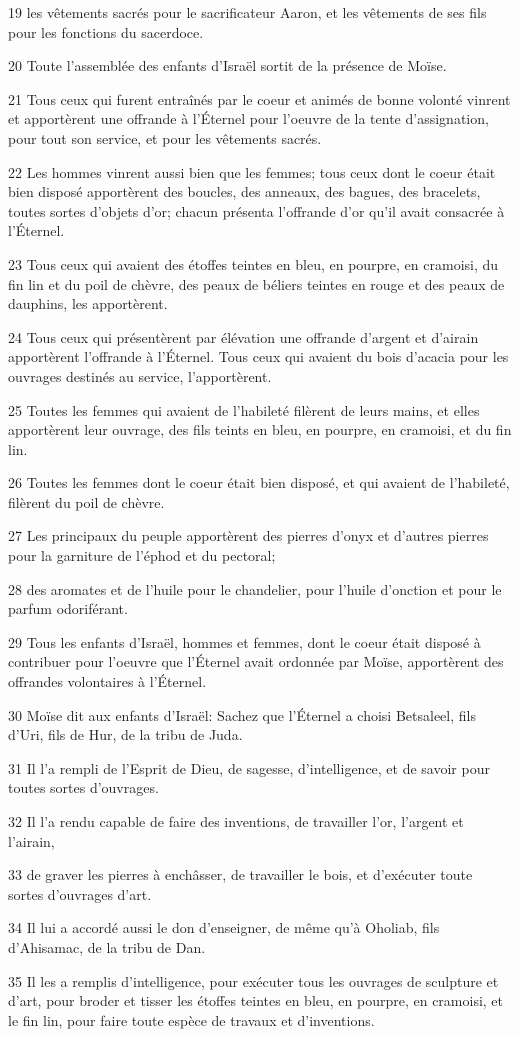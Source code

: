 \par 19 les vêtements sacrés pour le sacrificateur Aaron, et les vêtements de ses fils pour les fonctions du sacerdoce.
\par 20 Toute l'assemblée des enfants d'Israël sortit de la présence de Moïse.
\par 21 Tous ceux qui furent entraînés par le coeur et animés de bonne volonté vinrent et apportèrent une offrande à l'Éternel pour l'oeuvre de la tente d'assignation, pour tout son service, et pour les vêtements sacrés.
\par 22 Les hommes vinrent aussi bien que les femmes; tous ceux dont le coeur était bien disposé apportèrent des boucles, des anneaux, des bagues, des bracelets, toutes sortes d'objets d'or; chacun présenta l'offrande d'or qu'il avait consacrée à l'Éternel.
\par 23 Tous ceux qui avaient des étoffes teintes en bleu, en pourpre, en cramoisi, du fin lin et du poil de chèvre, des peaux de béliers teintes en rouge et des peaux de dauphins, les apportèrent.
\par 24 Tous ceux qui présentèrent par élévation une offrande d'argent et d'airain apportèrent l'offrande à l'Éternel. Tous ceux qui avaient du bois d'acacia pour les ouvrages destinés au service, l'apportèrent.
\par 25 Toutes les femmes qui avaient de l'habileté filèrent de leurs mains, et elles apportèrent leur ouvrage, des fils teints en bleu, en pourpre, en cramoisi, et du fin lin.
\par 26 Toutes les femmes dont le coeur était bien disposé, et qui avaient de l'habileté, filèrent du poil de chèvre.
\par 27 Les principaux du peuple apportèrent des pierres d'onyx et d'autres pierres pour la garniture de l'éphod et du pectoral;
\par 28 des aromates et de l'huile pour le chandelier, pour l'huile d'onction et pour le parfum odoriférant.
\par 29 Tous les enfants d'Israël, hommes et femmes, dont le coeur était disposé à contribuer pour l'oeuvre que l'Éternel avait ordonnée par Moïse, apportèrent des offrandes volontaires à l'Éternel.
\par 30 Moïse dit aux enfants d'Israël: Sachez que l'Éternel a choisi Betsaleel, fils d'Uri, fils de Hur, de la tribu de Juda.
\par 31 Il l'a rempli de l'Esprit de Dieu, de sagesse, d'intelligence, et de savoir pour toutes sortes d'ouvrages.
\par 32 Il l'a rendu capable de faire des inventions, de travailler l'or, l'argent et l'airain,
\par 33 de graver les pierres à enchâsser, de travailler le bois, et d'exécuter toute sortes d'ouvrages d'art.
\par 34 Il lui a accordé aussi le don d'enseigner, de même qu'à Oholiab, fils d'Ahisamac, de la tribu de Dan.
\par 35 Il les a remplis d'intelligence, pour exécuter tous les ouvrages de sculpture et d'art, pour broder et tisser les étoffes teintes en bleu, en pourpre, en cramoisi, et le fin lin, pour faire toute espèce de travaux et d'inventions.

